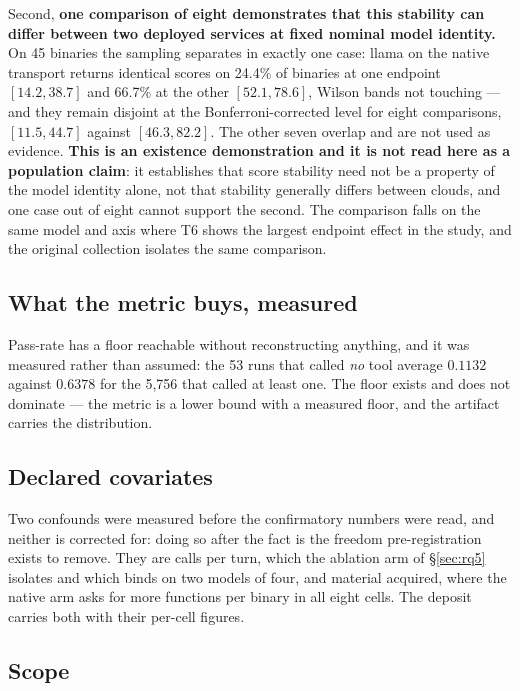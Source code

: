 Second, \textbf{one comparison of eight demonstrates that this stability can differ between two deployed
services at fixed nominal model identity.} On 45 binaries the sampling separates in exactly one case: llama
on the native transport returns identical scores on 24.4\% of binaries at one endpoint $[14.2, 38.7]$ and
66.7\% at the other $[52.1, 78.6]$, Wilson bands not touching --- and they remain disjoint at the
Bonferroni-corrected level for eight comparisons, $[11.5, 44.7]$ against $[46.3, 82.2]$. The other seven
overlap and are not used as evidence. \textbf{This is an existence demonstration and it is not read here as a
population claim}: it establishes that score stability need not be a property of the model identity alone,
not that stability generally differs between clouds, and one case out of eight cannot support the second.
The comparison falls on the same model and axis where T6 shows the largest endpoint effect in the study,
and the original collection isolates the same comparison.

\subsection{What the metric buys, measured}

Pass-rate has a floor reachable without reconstructing anything, and it was measured rather than
assumed: the 53 runs that called \emph{no} tool average $0.1132$ against $0.6378$ for the 5{,}756
that called at least one. The floor exists and does not dominate --- the metric is a lower bound with a
measured floor, and the artifact carries the distribution.
\subsection{Declared covariates}

Two confounds were measured before the confirmatory numbers were read, and neither is corrected for: doing
so after the fact is the freedom pre-registration exists to remove. They are calls per turn, which the
ablation arm of \S\ref{sec:rq5} isolates and which binds on two models of four, and material acquired,
where the native arm asks for more functions per binary in all eight cells. The deposit carries both with
their per-cell figures.

\subsection{Scope}

